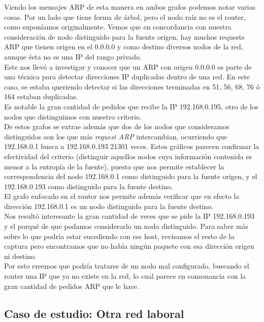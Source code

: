 \indent Viendo los mensajes ARP de esta manera en ambos grafos podemos notar varias cosas. Por un lado que tiene forma de árbol, pero el nodo raíz no es el router, como suponíamos originalmente. Vemos que en concordancia con nuestra consideración de nodo distinguido para la fuente origen, hay muchos requests ARP que tienen origen en el 0.0.0.0 y como destino diversos nodos de la red, aunque ésta no es una IP del rango privado.\\
\indent Este nos llevó a investigar y conocer que un ARP con origen 0.0.0.0 es parte de una técnica para detectar direcciones IP duplicadas dentro de una red. En este caso, se estaba queriendo detectar si las direcciones terminadas en 51, 56, 68, 76 ó 164 estaban duplicadas.\\
\indent Es notable la gran cantidad de pedidos que recibe la IP 192.168.0.195, otro de los nodos que distinguimos con nuestro criterio.\\
\indent De estos grafos se extrae además que dos de los nodos que consideramos distinguidos son los que más \textit{request ARP} intercambian, ocurriendo que  192.168.0.1 busca a 192.168.0.193 21301 veces. Estos gráficos parecen confirmar la efectividad del criterio (distinguir aquellos nodos cuya información contenida es menor a la entropía de la fuente), puesto que nos permite establecer la correspondencia del nodo 192.168.0.1 como  distinguido para la fuente origen, y el 192.168.0.193 como distinguido para la fuente destino.\\
\indent El grafo enfocado en el router nos permite además verificar que en efecto la dirección 192.168.0.1 es un nodo distinguido para la fuente destino.\\
\indent Nos resultó interesante la gran cantidad de veces que se pide la IP 192.168.0.193 y el porqué de que podamos considerarlo un nodo distinguido. Para saber más sobre lo que podría estar sucediendo con ese host, revisamos el resto de la captura pero encontramos que no había ningún paquete con esa dirección origen ni destino.\\
\indent Por esto creemos que podría tratarse de un nodo mal configurado, buscando el router una IP que ya no existe en la red, lo cual parece en consonancia con la gran cantidad de pedidos ARP que le hace.\\


\newpage
\subsection{Caso de estudio: Otra red laboral}

